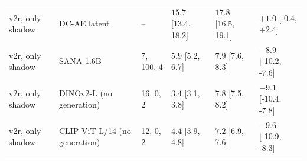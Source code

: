 \begin{tabular}{llllll}
v2r, only shadow & DC-AE latent & -- & $15.7$ \scriptsize{[13.4, 18.2]} & $17.8$ \scriptsize{[16.5, 19.1]} & $+1.0$ \scriptsize{[-0.4, +2.4]} \\
v2r, only shadow & SANA-1.6B & 7, 100, 4 & $5.9$ \scriptsize{[5.2, 6.7]} & $7.9$ \scriptsize{[7.6, 8.3]} & $-8.9$ \scriptsize{[-10.2, -7.6]} \\
v2r, only shadow & DINOv2-L (no generation) & 16, 0, 2 & $3.4$ \scriptsize{[3.1, 3.8]} & $7.8$ \scriptsize{[7.5, 8.2]} & $-9.1$ \scriptsize{[-10.4, -7.8]} \\
v2r, only shadow & CLIP ViT-L/14 (no generation) & 12, 0, 2 & $4.4$ \scriptsize{[3.9, 4.8]} & $7.2$ \scriptsize{[6.9, 7.6]} & $-9.6$ \scriptsize{[-10.9, -8.3]} \\
\bottomrule
\end{tabular}
